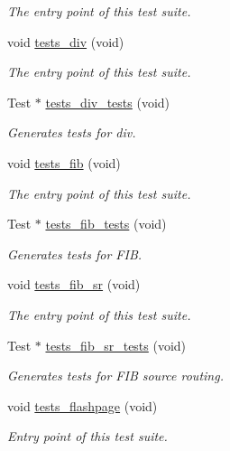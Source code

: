 \begin{DoxyCompactItemize}
\begin{DoxyCompactList}\small\item\em The entry point of this test suite. \end{DoxyCompactList}\item 
void \hyperlink{group__unittests_ga1161adbe65ee71e46440423762d1ed8b}{tests\+\_\+div} (void)
\begin{DoxyCompactList}\small\item\em The entry point of this test suite. \end{DoxyCompactList}\item 
Test $\ast$ \hyperlink{group__unittests_ga8e77add06e39b1bb9dbf9004f2ea4c95}{tests\+\_\+div\+\_\+tests} (void)
\begin{DoxyCompactList}\small\item\em Generates tests for div. \end{DoxyCompactList}\item 
void \hyperlink{group__unittests_ga278497a70466c93676af8839dbcfe05a}{tests\+\_\+fib} (void)
\begin{DoxyCompactList}\small\item\em The entry point of this test suite. \end{DoxyCompactList}\item 
Test $\ast$ \hyperlink{group__unittests_gab8c38a5edf2b7ff93e1282d7c1cdb0ef}{tests\+\_\+fib\+\_\+tests} (void)
\begin{DoxyCompactList}\small\item\em Generates tests for F\+IB. \end{DoxyCompactList}\item 
void \hyperlink{group__unittests_ga81367a9f08a307f54d685b422cf97f3d}{tests\+\_\+fib\+\_\+sr} (void)
\begin{DoxyCompactList}\small\item\em The entry point of this test suite. \end{DoxyCompactList}\item 
Test $\ast$ \hyperlink{group__unittests_ga61dfd0327d9f733fa863525f836b9c33}{tests\+\_\+fib\+\_\+sr\+\_\+tests} (void)
\begin{DoxyCompactList}\small\item\em Generates tests for F\+IB source routing. \end{DoxyCompactList}\item 
void \hyperlink{group__unittests_ga4e4d5da67e11b5dccfc097568ed36d82}{tests\+\_\+flashpage} (void)
\begin{DoxyCompactList}\small\item\em Entry point of this test suite. \end{DoxyCompactList}\item 

\end{DoxyCompactItemize}
